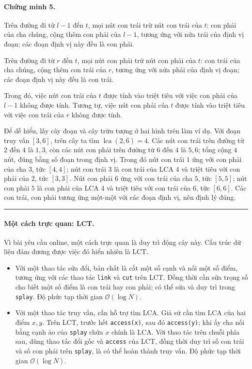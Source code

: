 \documentclass[11pt]{article}
\newcommand{\Oh}{\mathcal{O}}
\newcommand{\qedmark}{\hfill\rule{0.7ex}{0.7ex}}
\begin{document}
\paragraph{Chứng minh 5.}
Trên đường đi từ \(l-1\) đến \(t\), mọi nút con trái trừ nút con trái của
\(t\): con phải của cha chúng, cộng thêm con phải của \(l-1\), tương ứng với
nửa trái của định vị đoạn; các đoạn định vị này đều là con phải.

Trên đường đi từ \(r\) đến \(t\), mọi nút con phải trừ nút con phải của \(t\):
con trái của cha chúng, cộng thêm con trái của \(r\), tương ứng với nửa phải
của định vị đoạn; các đoạn định vị này đều là con trái.

Trong đó, việc nút con trái của \(t\) được tính vào triệt tiêu với việc con
phải của \(l-1\) không được tính. Tương tự, việc nút con phải của \(t\) được
tính vào triệt tiêu với việc con trái của \(r\) không được tính.

Để dễ hiểu, lấy cây đoạn và cây trừu tượng ở hai hình trên làm ví dụ. Với đoạn
truy vấn \([3,6]\), trên cây ta tìm
\(\operatorname{lca}(2,6)=4\). Các nút con trái trên đường từ \(2\) đến \(4\)
là \(1,3\), còn các nút con phải trên đường từ \(6\) đến \(4\) là \(5,6\);
tổng cộng \(4\) nút, đúng bằng số đoạn trong định vị. Trong đó nút con trái
\(1\) ứng với con phải của cha \(3\), tức \([4,4]\); nút con trái \(3\) là con
trái của LCA \(4\) và triệt tiêu với con phải của \(2\), tức \([3,3]\). Nút
con phải \(6\) ứng với con trái của cha \(5\), tức \([5,5]\); nút con phải
\(5\) là con phải của LCA \(4\) và triệt tiêu với con trái của \(6\), tức
\([6,6]\). Các con trái, con phải tương ứng một-một với các đoạn định vị, nên
định lý đúng. \qedmark

\paragraph{Một cách trực quan: LCT.}
Vì bài yêu cầu online, một cách trực quan là duy trì động cây này. Cấu trúc dữ
liệu đảm đương được việc đó hiển nhiên là LCT.

\begin{itemize}
  \item Với một thao tác sửa đổi, bản chất là cắt một số cạnh và nối một số
  điểm, tương ứng với các thao tác \texttt{link} và \texttt{cut} trên LCT. Đồng
  thời cần sửa trọng số cho biết một số điểm là con trái hay con phải; có thể
  sửa và duy trì trong \texttt{splay}. Độ phức tạp thời gian \(\Oh(\log N)\).

  \item Với một thao tác truy vấn, cần hỗ trợ tìm LCA. Giả sử cần tìm LCA của
  hai điểm \(x,y\). Trên LCT, trước hết \texttt{access(x)}, sau đó
  \texttt{access(y)}; khi ấy cha nối bằng cạnh ảo của \texttt{splay} chứa \(x\)
  chính là LCA. Với thao tác trên chuỗi phía sau, dùng thao tác đổi gốc và
  \texttt{access} của LCT, đồng thời duy trì số con trái và số con phải trên
  \texttt{splay}, là có thể hoàn thành truy vấn. Độ phức tạp thời gian
  \(\Oh(\log N)\).
\end{itemize}
\end{document}
